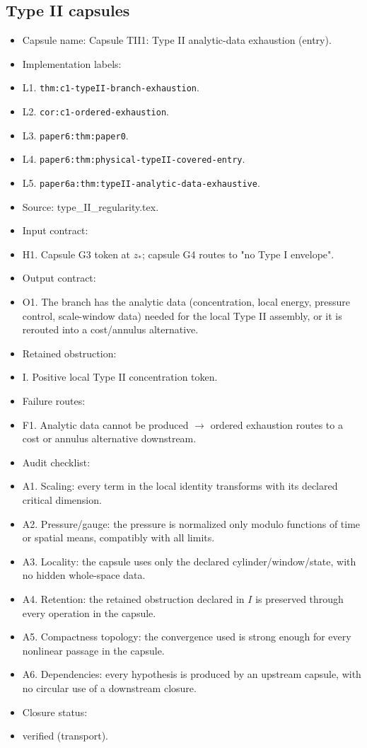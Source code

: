 \documentclass[11pt]{amsart}
\begin{document}
\subsection{Type II capsules}

\begin{itemize}
  \item Capsule name: Capsule TII1: Type II analytic-data exhaustion (entry).
  \item Implementation labels:
  \item L1. \texttt{thm:c1-typeII-branch-exhaustion}.
  \item L2. \texttt{cor:c1-ordered-exhaustion}.
  \item L3. \texttt{paper6:thm:paper0}.
  \item L4. \texttt{paper6:thm:physical-typeII-covered-entry}.
  \item L5. \texttt{paper6a:thm:typeII-analytic-data-exhaustive}.
  \item Source: type\_II\_regularity.tex.
  \item Input contract:
  \item H1. Capsule G3 token at $z_*$; capsule G4 routes to "no Type I envelope".
  \item Output contract:
  \item O1. The branch has the analytic data (concentration, local energy, pressure control, scale-window data) needed for the local Type II assembly, or it is rerouted into a cost/annulus alternative.
  \item Retained obstruction:
  \item I. Positive local Type II concentration token.
  \item Failure routes:
  \item F1. Analytic data cannot be produced $\to$ ordered exhaustion routes to a cost or annulus alternative downstream.
  \item Audit checklist:
  \item A1. Scaling: every term in the local identity transforms with its declared critical dimension.
  \item A2. Pressure/gauge: the pressure is normalized only modulo functions of time or spatial means, compatibly with all limits.
  \item A3. Locality: the capsule uses only the declared cylinder/window/state, with no hidden whole-space data.
  \item A4. Retention: the retained obstruction declared in $I$ is preserved through every operation in the capsule.
  \item A5. Compactness topology: the convergence used is strong enough for every nonlinear passage in the capsule.
  \item A6. Dependencies: every hypothesis is produced by an upstream capsule, with no circular use of a downstream closure.
  \item Closure status:
  \item verified (transport).
\end{itemize}
\end{document}
